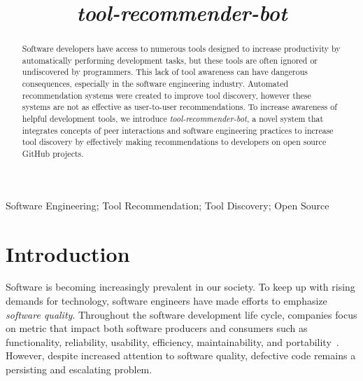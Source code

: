 \documentclass[conference]{IEEEtran}
\newcommand{\tool}{\textsl{tool-recommender-bot}}
\begin{document}

\title{\tool}

\author{
}

\maketitle
\begin{abstract}
Software developers have access to numerous tools designed to increase productivity by automatically performing development tasks, but these tools are often ignored or undiscovered by programmers. This lack of tool awareness can have dangerous consequences, especially in the software engineering industry. Automated recommendation systems were created to improve tool discovery, however these systems are not as effective as user-to-user recommendations. To increase awareness of helpful development tools, we introduce \textit{\tool}, a novel system that integrates concepts of peer interactions and software engineering practices to increase tool discovery by effectively making recommendations to developers on open source GitHub projects.
\end{abstract}

\begin{IEEEkeywords}
Software Engineering; Tool Recommendation; Tool Discovery; Open Source
\end{IEEEkeywords}

\section{Introduction}

Software is becoming increasingly prevalent in our society. To keep up with rising demands for technology, software engineers have made efforts to emphasize \textit{software quality}. Throughout the software development life cycle, companies focus on metric that impact both software producers and consumers such as functionality, reliability, usability, efficiency, maintainability, and portability~\cite{KitchenhamQualityTarget}. However, despite increased attention to software quality, defective code remains a persisting and escalating problem. 
\end{document}

